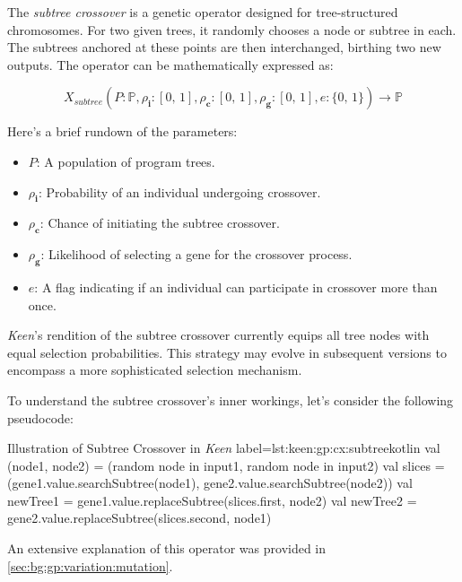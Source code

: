 \begin{definition}
    The \textit{subtree crossover} is a genetic operator designed for 
    tree-structured chromosomes. For two given trees, it randomly chooses a 
    node or subtree in each. The subtrees anchored at these points are then 
    interchanged, birthing two new outputs. The operator can be mathematically 
    expressed as:

    \begin{equation}
        X_{subtree}(P: \mathbb{P}, \rho_\mathbf{i}: [0,\, 1], \rho_\mathbf{c}: [0,\, 1], \rho_\mathbf{g}: [0,\, 1], e: \{0,\, 1\}) \to \mathbb{P}
    \end{equation}

    Here's a brief rundown of the parameters:

    \begin{itemize}
    \item \(P\): A population of program trees.
    \item \(\rho_\mathbf{i}\): Probability of an individual undergoing crossover.
    \item \(\rho_\mathbf{c}\): Chance of initiating the subtree crossover.
    \item \(\rho_\mathbf{g}\): Likelihood of selecting a gene for the crossover process.
    \item \(e\): A flag indicating if an individual can participate in crossover more than once.
    \end{itemize}
\end{definition}

\begin{remark}
    \textit{Keen}'s rendition of the subtree crossover currently equips all 
    tree nodes with equal selection probabilities. This strategy may evolve 
    in subsequent versions to encompass a more sophisticated selection 
    mechanism.
\end{remark}

To understand the subtree crossover's inner workings, let's consider the following pseudocode:

\begin{code}{
    Illustration of Subtree Crossover in \textit{Keen}
}{label=lst:keen:gp:cx:subtree}{kotlin}
    val (node1, node2) = (random node in input1, random node in input2)
    val slices = (gene1.value.searchSubtree(node1), gene2.value.searchSubtree(node2))
    val newTree1 = gene1.value.replaceSubtree(slices.first, node2)
    val newTree2 = gene2.value.replaceSubtree(slices.second, node1)
    \end{code}

An extensive explanation of this operator was provided in \vref{sec:bg:gp:variation:mutation}.
